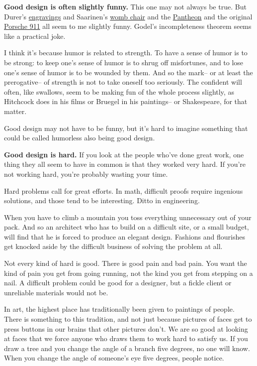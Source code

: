 \documentclass[12pt]{book}
\begin{document}
\textbf{Good design is often slightly funny.} This one may not always be
true. But Durer's \href{pilate.html}{engravings} and Saarinen's
\href{womb.html}{womb chair} and the \href{pantheon.html}{Pantheon} and
the original \href{1974-911s.html}{Porsche 911} all seem to me slightly
funny. Godel's incompleteness theorem seems like a practical joke.

I think it's because humor is related to strength. To have a sense of
humor is to be strong: to keep one's sense of humor is to shrug off
misfortunes, and to lose one's sense of humor is to be wounded by them.
And so the mark-- or at least the prerogative-- of strength is not to
take oneself too seriously. The confident will often, like swallows,
seem to be making fun of the whole process slightly, as Hitchcock does
in his films or Bruegel in his paintings-- or Shakespeare, for that
matter.

Good design may not have to be funny, but it's hard to imagine something
that could be called humorless also being good design.

\textbf{Good design is hard.} If you look at the people who've done
great work, one thing they all seem to have in common is that they
worked very hard. If you're not working hard, you're probably wasting
your time.

Hard problems call for great efforts. In math, difficult proofs require
ingenious solutions, and those tend to be interesting. Ditto in
engineering.

When you have to climb a mountain you toss everything unnecessary out of
your pack. And so an architect who has to build on a difficult site, or
a small budget, will find that he is forced to produce an elegant
design. Fashions and flourishes get knocked aside by the difficult
business of solving the problem at all.

Not every kind of hard is good. There is good pain and bad pain. You
want the kind of pain you get from going running, not the kind you get
from stepping on a nail. A difficult problem could be good for a
designer, but a fickle client or unreliable materials would not be.

In art, the highest place has traditionally been given to paintings of
people. There is something to this tradition, and not just because
pictures of faces get to press buttons in our brains that other pictures
don't. We are so good at looking at faces that we force anyone who draws
them to work hard to satisfy us. If you draw a tree and you change the
angle of a branch five degrees, no one will know. When you change the
angle of someone's eye five degrees, people notice.
\end{document}
